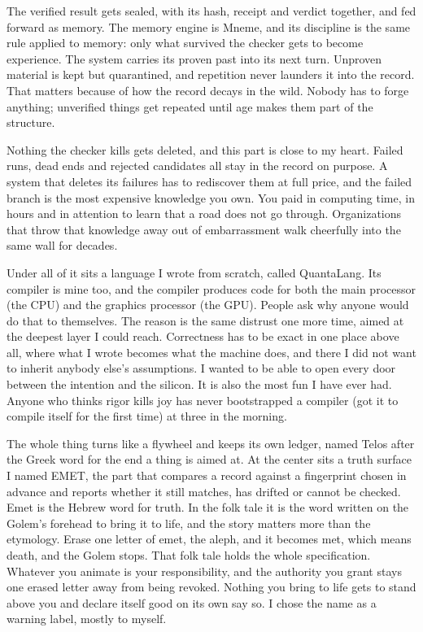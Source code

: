 \documentclass[11pt]{article}
\begin{document}
The verified result gets sealed, with its hash, receipt and verdict together, and fed forward as memory. The memory engine is Mneme, and its discipline is the same rule applied to memory: only what survived the checker gets to become experience. The system carries its proven past into its next turn. Unproven material is kept but quarantined, and repetition never launders it into the record. That matters because of how the record decays in the wild. Nobody has to forge anything; unverified things get repeated until age makes them part of the structure.

Nothing the checker kills gets deleted, and this part is close to my heart. Failed runs, dead ends and rejected candidates all stay in the record on purpose. A system that deletes its failures has to rediscover them at full price, and the failed branch is the most expensive knowledge you own. You paid in computing time, in hours and in attention to learn that a road does not go through. Organizations that throw that knowledge away out of embarrassment walk cheerfully into the same wall for decades.

Under all of it sits a language I wrote from scratch, called QuantaLang. Its compiler is mine too, and the compiler produces code for both the main processor (the CPU) and the graphics processor (the GPU). People ask why anyone would do that to themselves. The reason is the same distrust one more time, aimed at the deepest layer I could reach. Correctness has to be exact in one place above all, where what I wrote becomes what the machine does, and there I did not want to inherit anybody else's assumptions. I wanted to be able to open every door between the intention and the silicon. It is also the most fun I have ever had. Anyone who thinks rigor kills joy has never bootstrapped a compiler (got it to compile itself for the first time) at three in the morning.

The whole thing turns like a flywheel and keeps its own ledger, named Telos after the Greek word for the end a thing is aimed at. At the center sits a truth surface I named EMET, the part that compares a record against a fingerprint chosen in advance and reports whether it still matches, has drifted or cannot be checked. Emet is the Hebrew word for truth. In the folk tale it is the word written on the Golem's forehead to bring it to life, and the story matters more than the etymology. Erase one letter of emet, the aleph, and it becomes met, which means death, and the Golem stops. That folk tale holds the whole specification. Whatever you animate is your responsibility, and the authority you grant stays one erased letter away from being revoked. Nothing you bring to life gets to stand above you and declare itself good on its own say so. I chose the name as a warning label, mostly to myself.
\end{document}
